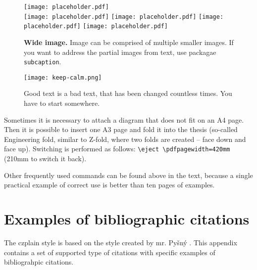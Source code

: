 \begin{figure*}[h]\centering
  \centering
  \texttt{[image: placeholder.pdf]}\\[1pt]
  \texttt{[image: placeholder.pdf]}\hfill
  \texttt{[image: placeholder.pdf]}\hfill
  \texttt{[image: placeholder.pdf]}\hfill
  \texttt{[image: placeholder.pdf]}
  \caption{\textbf{Wide image.} Image can be comprised of multiple smaller images. If you want to address the partial images from text, use packagae \texttt{subcaption}.}
  \label{sirokyObrazek}
\end{figure*}


\begin{figure}[hbt]
	\centering
	\texttt{[image: keep-calm.png]}
	\caption{Good text is a bad text, that has been changed countless times. You have to start somewhere.}
	\label{keepCalm}
\end{figure}

Sometimes it is necessary to attach a diagram that does not fit on an A4 page. Then it is possible to insert one A3 page and fold it into the thesis (so-called Engineering fold, similar to Z-fold, where two folds are created -- face down and face up). Switching is performed as follows: \texttt{\textbackslash{}eject \textbackslash{}pdfpagewidth=420mm} (210mm to switch it back).

Other frequently used commands can be found above in the text, because a single practical example of correct use is better than ten pages of examples.



\newcommand{\odradkovani}{\\[0.3em]}

\chapter{Examples of bibliographic citations}
\label{priloha-priklady-citaci}
The czplain style is based on the style created by mr. Pyšný \cite{Pysny}. This appendix contains a set of supported type of citations with specific examples of bibliograhpic citations.

